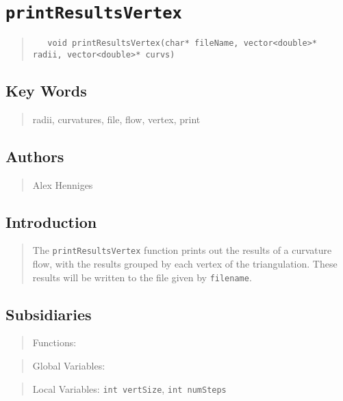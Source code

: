 \documentclass[10pt]{article}%
\begin{document}

\section*{\texttt{printResultsVertex}}

\label{f0}\begin{quotation} {\small{\begin{verbatim} 
   void printResultsVertex(char* fileName, vector<double>* radii, vector<double>* curvs)
   \end{verbatim}
}}
\end{quotation}
\subsection*{Key Words}

\begin{quotation} radii, curvatures, file, flow, vertex, print\end{quotation}

\subsection*{Authors}

\begin{quotation} Alex Henniges\end{quotation}

\subsection*{Introduction}

\begin{quotation} The \texttt{printResultsVertex} function prints out the results of a curvature flow, with the results grouped by each vertex of the triangulation. These results will be written to the file given by \texttt{filename}.\end{quotation}

\subsection*{Subsidiaries}

\begin{quotation} Functions:\end{quotation}
\begin{quotation} Global Variables:\end{quotation}
\begin{quotation} Local Variables: \texttt{int vertSize}, \texttt{int numSteps}\end{quotation}
\end{document}
